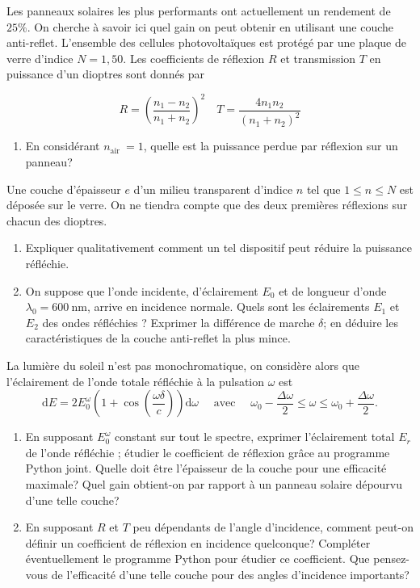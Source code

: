 Les panneaux solaires les plus performants ont actuellement un rendement de $25 \%$. On cherche à savoir ici quel gain on peut obtenir en utilisant une couche anti-reflet. L'ensemble des cellules photovoltaïques est protégé par une plaque de verre d'indice $N=1,50$. Les coefficients de réflexion $R$ et transmission $T$ en puissance d'un dioptres sont donnés par

$$
R=\left(\frac{n_1-n_2}{n_1+n_2}\right)^2 \quad T=\frac{4 n_1 n_2}{\left(n_1+n_2\right)^2}
$$

\begin{enumerate}
\item En considérant $n_{\text {air }}=1$, quelle est la puissance perdue par réflexion sur un panneau?
\end{enumerate}

Une couche d'épaisseur $e$ d'un milieu transparent d'indice $n$ tel que $1 \leqslant n \leqslant N$ est déposée sur le verre. On ne tiendra compte que des deux premières réflexions sur chacun des dioptres.

\begin{center}
\end{center}

\begin{enumerate}[resume]
\item Expliquer qualitativement comment un tel dispositif peut réduire la puissance réfléchie.
\item On suppose que l'onde incidente, d'éclairement $E_0$ et de longueur d'onde $\lambda_0=600 \mathrm{~nm}$, arrive en incidence normale. Quels sont les éclairements $E_1$ et $E_2$ des ondes réfléchies ? Exprimer la différence de marche $\delta$; en déduire les caractéristiques de la couche anti-reflet la plus mince.
\end{enumerate}

La lumière du soleil n'est pas monochromatique, on considère alors que l'éclairement de l'onde totale réfléchie à la pulsation $\omega$ est
$$
\mathrm{d} E=2 E_0^\omega\left(1+\cos \left(\frac{\omega \delta}{c}\right)\right) \mathrm{d} \omega \quad \text { avec } \quad \omega_0-\frac{\Delta \omega}{2} \leqslant \omega \leqslant \omega_0+\frac{\Delta \omega}{2} .
$$

\begin{enumerate}[resume]
\item En supposant $E_0^\omega$ constant sur tout le spectre, exprimer l'éclairement total $E_r$ de l'onde réfléchie ; étudier le coefficient de réflexion grâce au programme Python joint. Quelle doit être l'épaisseur de la couche pour une efficacité maximale? Quel gain obtient-on par rapport à un panneau solaire dépourvu d'une telle couche?
\item En supposant $R$ et $T$ peu dépendants de l'angle d'incidence, comment peut-on définir un coefficient de réflexion en incidence quelconque? Compléter éventuellement le programme Python pour étudier ce coefficient. Que pensez-vous de l'efficacité d'une telle couche pour des angles d'incidence importants?
\end{enumerate}

